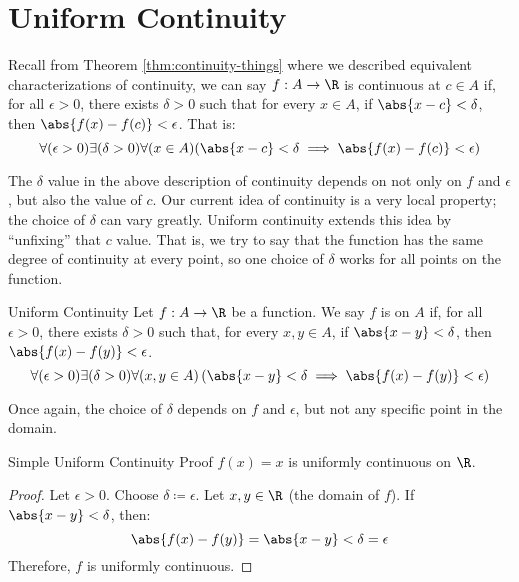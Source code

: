 \section{Uniform Continuity}

Recall from Theorem \ref{thm:continuity-things} where we described equivalent characterizations of continuity, we can say $f : A \to \R$ is continuous at $c \in A$ if, for all $\epsilon > 0$, there exists $\delta > 0$ such that for every $x \in A$, if $\abs{x-c} < \delta$, then $\abs{f(x) - f(c)} < \epsilon$. That is:
\[ \forall (\epsilon > 0) \exists (\delta > 0) \forall (x \in A) (\abs{x-c} < \delta \implies \abs{f(x) - f(c)} < \epsilon) \]

The $\delta$ value in the above description of continuity depends on not only on $f$ and $\epsilon$, but also the value of $c$. Our current idea of continuity is a very local property; the choice of $\delta$ can vary greatly. Uniform continuity extends this idea by ``unfixing'' that $c$ value. That is, we try to say that the function has the same degree of continuity at every point, so one choice of $\delta$ works for all points on the function.


\begin{dfnbox}{Uniform Continuity}{}
    Let $f : A \to \R$ be a function. We say $f$ is  on $A$ if, for all $\epsilon > 0$, there exists $\delta > 0$ such that, for every $x,y \in A$, if $\abs{x-y} < \delta$, then $\abs{f(x) - f(y)} < \epsilon$.
    \tcblower
    \[ \forall (\epsilon > 0) \exists (\delta > 0) \forall (x,y \in A) \left( \abs{x-y} < \delta \implies \abs{f(x) - f(y)} < \epsilon \right) \]
\end{dfnbox}

Once again, the choice of $\delta$ depends on $f$ and $\epsilon$, but not any specific point in the domain.

\begin{exbox}{Simple Uniform Continuity Proof}{}
    $f(x) = x$ is uniformly continuous on $\R$.
    \tcblower
    \begin{proof}
        Let $\epsilon > 0$. Choose $\delta \coloneq \epsilon$. Let $x,y \in \R$ (the domain of $f$). If $\abs{x-y} < \delta$, then:
        \[ \abs{f(x) - f(y)} = \abs{x - y} < \delta = \epsilon \]
        Therefore, $f$ is uniformly continuous.
    \end{proof}
\end{exbox}

